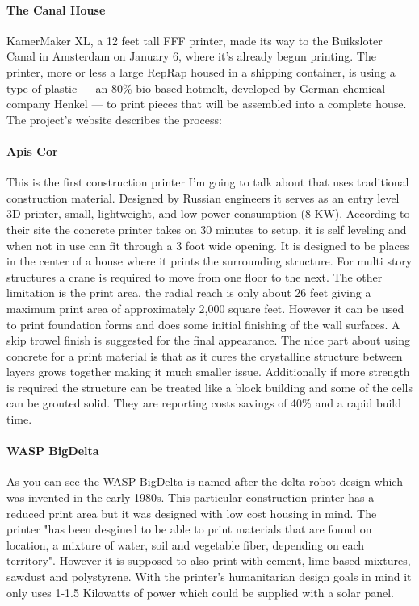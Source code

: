 \documentclass[11pt]{article}
\begin{document}
\paragraph{The Canal House}
KamerMaker XL, a 12 feet tall FFF printer, made its way to the Buiksloter Canal in Amsterdam on January 6, where it’s already begun printing. The printer, more or less a large RepRap housed in a shipping container, is using a type of plastic — an 80\% bio-based hotmelt, developed by German chemical company Henkel — to print pieces that will be assembled into a complete house. The project’s website describes the process:
\paragraph{Apis Cor}
This is the first construction printer I'm going to talk about that uses traditional construction material.  Designed by Russian engineers it serves as an entry level 3D printer, small, lightweight, and low power consumption (8 KW).  According to their site the concrete printer takes on 30 minutes to setup, it is self leveling and when not in use can fit through a 3 foot wide opening.  It is designed to be places in the center of a house where it prints the surrounding structure.  For multi story structures a crane is required to move from one floor to the next.  The other limitation is the print area, the radial reach is only about 26 feet giving a maximum print area of approximately 2,000 square feet.  However it can be used to print foundation forms and does some initial finishing of the wall surfaces.  A skip trowel finish is suggested for the final appearance.  The nice part about using concrete for a print material is that as it cures the crystalline structure between layers grows together making it much smaller issue.  Additionally if more strength is required the structure can be treated like a block building and some of the cells can be grouted solid.  They are reporting costs savings of 40\% and a rapid build time.  
\paragraph{WASP BigDelta}
As you can see the WASP BigDelta is named after the delta robot design which was invented in the early 1980s.  This particular construction printer has a reduced print area but it was designed with low cost housing in mind.  The printer "has been desgined to be able to print materials that are found on location, a mixture of water, soil and vegetable fiber, depending on each territory". However it is supposed to also print with cement, lime based mixtures, sawdust and polystyrene.  With the printer's humanitarian design goals in mind it only uses 1-1.5 Kilowatts of power which could be supplied with a solar panel.
\end{document}
